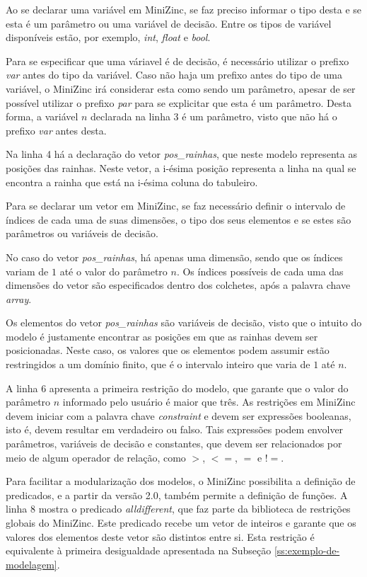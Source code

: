 Ao se declarar uma variável em MiniZinc, se faz preciso informar o tipo desta e se esta é um parâmetro ou uma variável de decisão. Entre os tipos de variável disponíveis estão, por exemplo, \textit{int}, \textit{float} e \textit{bool}.

Para se especificar que uma váriavel é de decisão, é necessário utilizar o prefixo \textit{var} antes do tipo da variável. Caso não haja um prefixo antes do tipo de uma variável, o MiniZinc irá considerar esta como sendo um parâmetro, apesar de ser possível utilizar o prefixo \textit{par} para se explicitar que esta é um parâmetro. Desta forma, a variável $n$ declarada na linha 3 é um parâmetro, visto que não há o prefixo \textit{var} antes desta.

Na linha 4 há a declaração do vetor \textit{pos\_rainhas}, que neste modelo representa as posições das rainhas. Neste vetor, a i-ésima posição representa a linha na qual se encontra a rainha que está na i-ésima coluna do tabuleiro.
  
Para se declarar um vetor em MiniZinc, se faz necessário definir o intervalo de índices de cada uma de suas dimensões, o tipo dos seus elementos e se estes são parâmetros ou variáveis de decisão.

No caso do vetor \textit{pos\_rainhas}, há apenas uma dimensão, sendo que os índices variam de $1$ até o valor do parâmetro $n$. Os índices possíveis de cada uma das dimensões do vetor são especificados dentro dos colchetes, após a palavra chave \textit{array}.

Os elementos do vetor \textit{pos\_rainhas} são variáveis de decisão, visto que o intuito do modelo é justamente encontrar as posições em que as rainhas devem ser posicionadas. Neste caso, os valores que os elementos podem assumir estão restringidos a um domínio finito, que é o intervalo inteiro que varia de $1$ até $n$.

A linha 6 apresenta a primeira restrição do modelo, que garante que o valor do parâmetro $n$ informado pelo usuário é maior que três. As restrições em MiniZinc devem iniciar com a palavra chave \textit{constraint} e devem ser expressões booleanas, isto é, devem resultar em verdadeiro ou falso. Tais expressões podem envolver parâmetros, variáveis de decisão e constantes, que devem ser relacionados por meio de algum operador de relação, como $>$, $<=$, $=$ e $!=$.

Para facilitar a modularização dos modelos, o MiniZinc possibilita a definição de predicados, e a partir da versão 2.0, também permite a definição de funções. A linha 8 mostra o predicado \textit{alldifferent}, que faz parte da biblioteca de restrições globais do MiniZinc. Este predicado recebe um vetor de inteiros e garante que os valores dos elementos deste vetor são distintos entre si. Esta restrição é equivalente à primeira desigualdade apresentada na Subseção \ref{ss:exemplo-de-modelagem}.

